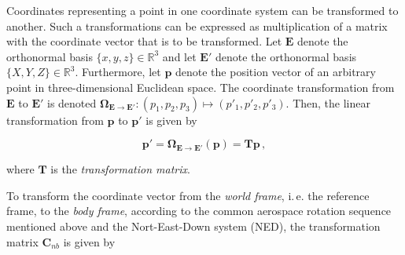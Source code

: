 Coordinates representing a point in one coordinate system can be transformed to another. Such a transformations can be expressed as multiplication of a matrix with the coordinate vector that is to be transformed. Let $\mathbf{E}$ denote the orthonormal basis $\{x, y, z\} \in \mathbb{R}^3$ and let $\mathbf{E}'$ denote the orthonormal basis $\{X, Y, Z\} \in \mathbb{R}^3$. Furthermore, let $\mathbf{p}$ denote the position vector of an arbitrary point in three-dimensional Euclidean space. The coordinate transformation from $\mathbf{E}$ to $\mathbf{E}'$ is denoted $\bm{\Omega}_{\mathbf{E} \rightarrow \mathbf{E}'}: (p_1, p_2, p_3) \mapsto (p'_1, p'_2, p'_3)$. Then, the linear transformation from $\mathbf{p}$ to $\mathbf{p}'$ is given by

\begin{equation}\label{eq:transformation}
  \mathbf{p'} = \bm{\Omega}_{\mathbf{E} \rightarrow \mathbf{E}'}(\mathbf{p}) = \mathbf{T} \mathbf{p}\,,
\end{equation}

\noindent
where $\mathbf{T}$ is the \emph{transformation matrix}.

To transform the coordinate vector from the \emph{world frame}, i.\,e. the reference frame, to the \emph{body frame}, according to the common aerospace rotation sequence mentioned above and the Nort-East-Down system (NED), the transformation matrix $\mathbf{C}_{nb}$ is given by

